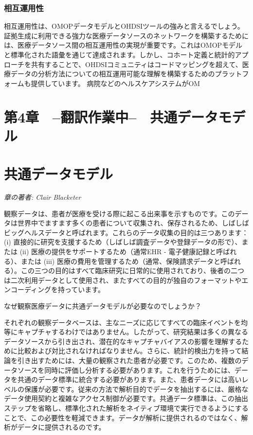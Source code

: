 \documentclass[
  11pt]{book}
\theoremstyle{definition}
\theoremstyle{definition}
\theoremstyle{definition}
\theoremstyle{definition}
\theoremstyle{remark}
\begin{document}
\subsection{相互運用性}\label{ux76f8ux4e92ux904bux7528ux6027}

相互運用性は、OMOPデータモデルとOHDSIツールの強みと言えるでしょう。証拠生成に利用できる強力な医療データソースのネットワークを構築するためには、医療データソース間の相互運用性の実現が重要です。これはOMOPモデルと標準化された語彙を通じて達成されます。しかし、コホート定義と統計的アプローチを共有することで、OHDSIコミュニティはコードマッピングを超えて、医療データの分析方法についての相互運用可能な理解を構築するためのプラットフォームも提供しています。 病院などのヘルスケアシステムがOM

\chapter*{第4章　--翻訳作業中--　共通データモデル}\label{ux7b2c4ux7ae0-ux7ffbux8a33ux4f5cux696dux4e2d-ux5171ux901aux30c7ux30fcux30bfux30e2ux30c7ux30eb}

\chapter{共通データモデル}\label{CommonDataModel}

\emph{章の著者: Clair Blacketer}

観察データは、患者が医療を受ける際に起こる出来事を示すものです。このデータは世界中でますます多くの患者について収集され、保存されるため、しばしばビッグヘルスデータと呼ばれます。これらのデータ収集の目的は三つあります：(i) 直接的に研究を支援するため（しばしば調査データや登録データの形で）、または (ii) 医療の提供をサポートするため（通常EHR - 電子健康記録と呼ばれる）、または (iii) 医療の費用を管理するため（通常、保険請求データと呼ばれる）。この三つの目的はすべて臨床研究に日常的に使用されており、後者の二つは二次利用データとして使用され、またすべての目的が独自のフォーマットやエンコーディングを持っています。   

なぜ観察医療データに共通データモデルが必要なのでしょうか？

それぞれの観察データベースは、主なニーズに応じてすべての臨床イベントを均等にキャプチャするわけではありません。したがって、研究結果は多くの異なるデータソースから引き出され、潜在的なキャプチャバイアスの影響を理解するために比較および対比されなければなりません。さらに、統計的検出力を持って結論を引き出すためには、大量の観察された患者が必要です。このため、複数のデータソースを同時に評価し分析する必要があります。これを行うためには、データを共通のデータ標準に統合する必要があります。また、患者データには高いレベルの保護が必要です。従来の方法で解析目的でデータを抽出するには、厳格なデータ使用契約と複雑なアクセス制御が必要です。共通データ標準は、この抽出ステップを省略し、標準化された解析をネイティブ環境で実行できるようにすることで、この必要性を軽減できます。データが解析に提供されるのではなく、解析がデータに提供されるのです。
\end{document}
